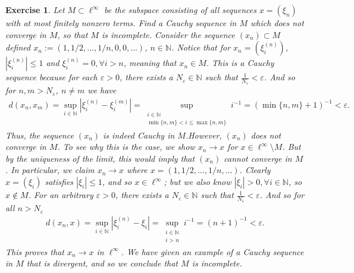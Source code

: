 \documentclass[11pt]{article}
\theoremstyle{mystyle}
\newtheorem{protoexer}{Exercise}[section]
\newenvironment{exer}
{\colorlet{shadecolor}{blue!15}\begin{shaded}\begin{protoexer}}
{\end{protoexer}\end{shaded}}
\begin{document}
\begin{exer}\label{subsetlinfty}
Let $M \subset \ell^{\infty}$ be the subspace consisting of all sequences $x = (\xi_n)$ with at most finitely nonzero terms. Find a Cauchy sequence in $M$ which does not converge in $M$, so that $M$ is incomplete.\newline
Consider the sequence $(x_n) \subset M$ defined $x_n := (1, 1/2, \ldots, 1/n, 0, 0, \ldots)$, $n \in \mathbb{N}$. Notice that for $x_n = (\xi_i^{(n)})$, $|\xi_i^{(n)}| \leq 1$ and $\xi_i^{(n)} = 0, \forall i > n$, meaning that $x_n \in M$. This is a Cauchy sequence because for each $\varepsilon > 0$, there exists a $N_{\varepsilon} \in \mathbb{N}$ such that $\frac{1}{N_{\varepsilon}} < \varepsilon$. And so for $n, m > N_{\varepsilon}$, $n \neq m$  we have
\begin{align*}
    d(x_n, x_m) = \sup_{i \in \mathbb{N}}|\xi_i^{(n)} -\xi_i^{(m)}| = \sup_{\substack{i \in \mathbb{N}\\ \min\{n, m\} < i \leq \max\{n, m\}}} i^{-1} = (\min\{n, m\} + 1)^{-1} < \varepsilon.
\end{align*}
Thus, the sequence $(x_n)$ is indeed Cauchy in $M$.\newline However, $(x_n)$ does not converge in $M$. To see why this is the case, we show $x_n \longrightarrow x$ for $x \in \ell^{\infty}\setminus M$. But by the uniqueness of the limit, this would imply that $(x_n)$ cannot converge in $M$. In particular, we claim $x_n \longrightarrow x$ where $x = (1, 1/2, \ldots, 1/n, \ldots)$. Clearly $x=(\xi_i)$ satisfies $|\xi_i| \leq 1$, and so $x \in \ell^{\infty}$; but we also know $|\xi_i| > 0, \forall i \in \mathbb{N}$, so $x \notin M$. For an arbitrary $\varepsilon > 0$, there exists a $N_{\varepsilon} \in \mathbb{N}$ such that $\frac{1}{N_{\varepsilon}} < \varepsilon$. And so for all $n > N_{\varepsilon}$
\begin{align*}
    d(x_n, x) = \sup_{i \in \mathbb{N}}|\xi_i^{(n)} - \xi_i| = \sup_{\substack{i \in \mathbb{N}\\i > n}} i^{-1} = (n+1)^{-1} < \varepsilon.
\end{align*}
This proves that $x_n \longrightarrow x$ in $\ell^{\infty}$. We have given an example of a Cauchy sequence in $M$ that is divergent, and so we conclude that $M$ is incomplete.
\end{exer}
\end{document}
